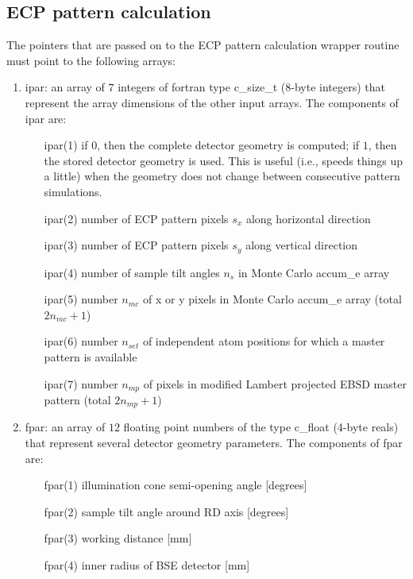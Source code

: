 \documentclass[DIV=calc, paper=letter, fontsize=11pt]{scrartcl}	 %
\begin{document}
\subsection{ECP pattern calculation}
The pointers that are passed on to the ECP pattern calculation wrapper routine must point to the following arrays:
\begin{enumerate}
	\item \textsf{ipar}: an array of $7$ integers of fortran type \textsf{c\_size\_t} ($8$-byte integers) that represent the array dimensions
	of the other input arrays.  The components of \textsf{ipar} are:
		\begin{enumerate}
			\item[\textsf{ipar}(1)] if $0$, then the complete detector geometry is computed; if $1$, then the stored detector geometry is used.  This is useful (i.e., speeds things up a little)
			when the geometry does not change between consecutive pattern simulations.
			\item[\textsf{ipar}(2)] number of ECP pattern pixels $s_x$ along horizontal direction
			\item[\textsf{ipar}(3)] number of ECP pattern pixels $s_y$ along vertical direction
			\item[\textsf{ipar}(4)] number of sample tilt angles $n_s$ in Monte Carlo \textsf{accum\_e} array
			\item[\textsf{ipar}(5)] number $n_{mc}$ of x or y pixels in Monte Carlo \textsf{accum\_e} array (total $2n_{mc}+1$)
			\item[\textsf{ipar}(6)] number $n_{set}$ of independent atom positions for which a master pattern is available
			\item[\textsf{ipar}(7)] number $n_{mp}$ of pixels in modified Lambert projected EBSD master pattern (total $2n_{mp}+1$)
		\end{enumerate}
	\item \textsf{fpar}: an array of $12$ floating point numbers of the type \textsf{c\_float} (4-byte reals) that represent several detector geometry parameters. The 
	components of \textsf{fpar} are:
	\begin{enumerate}
		\item[\textsf{fpar}(1)] illumination cone semi-opening angle [degrees]
		\item[\textsf{fpar}(2)] sample tilt angle around RD axis [degrees]
		\item[\textsf{fpar}(3)] working distance [mm]
		\item[\textsf{fpar}(4)] inner radius of BSE detector [mm]

\end{enumerate}
\end{enumerate}
\end{document}
